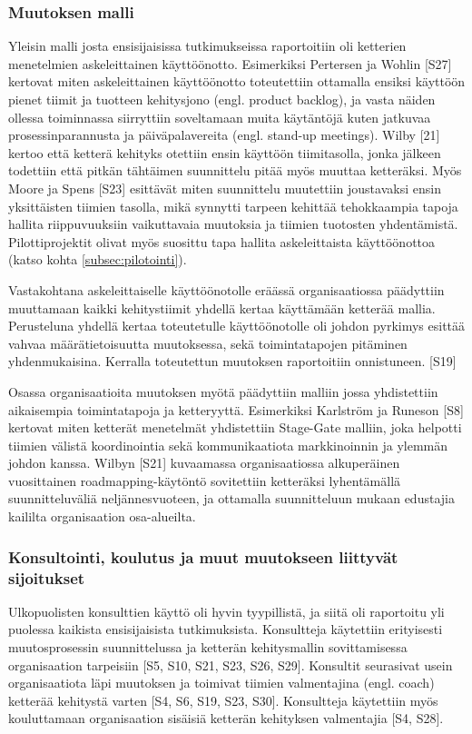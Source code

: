 \subsubsection{Muutoksen malli}

Yleisin malli josta ensisijaisissa tutkimukseissa raportoitiin oli ketterien
menetelmien askeleittainen käyttöönotto. Esimerkiksi Pertersen ja Wohlin [S27]
kertovat miten askeleittainen käyttöönotto toteutettiin ottamalla ensiksi
käyttöön pienet tiimit ja tuotteen kehitysjono (engl. product backlog), ja vasta
näiden ollessa toiminnassa siirryttiin soveltamaan muita käytäntöjä kuten
jatkuvaa prosessinparannusta ja päiväpalavereita (engl. stand-up meetings).
Wilby [21] kertoo että ketterä kehityks otettiin ensin käyttöön tiimitasolla,
jonka jälkeen todettiin että pitkän tähtäimen suunnittelu pitää myös muuttaa
ketteräksi. Myös Moore ja Spens [S23] esittävät miten suunnittelu muutettiin
joustavaksi ensin yksittäisten tiimien tasolla, mikä synnytti tarpeen kehittää
tehokkaampia tapoja hallita riippuvuuksiin vaikuttavaia muutoksia ja tiimien
tuotosten yhdentämistä. Pilottiprojektit olivat myös suosittu tapa hallita
askeleittaista käyttöönottoa (katso kohta \ref{subsec:pilotointi}).

Vastakohtana askeleittaiselle käyttöönotolle eräässä organisaatiossa päädyttiin
muuttamaan kaikki kehitystiimit yhdellä kertaa käyttämään ketterää mallia.
Perusteluna yhdellä kertaa toteutetulle käyttöönotolle oli johdon pyrkimys
esittää vahvaa määrätietoisuutta muutoksessa, sekä toimintatapojen pitäminen
yhdenmukaisina. Kerralla toteutettun muutoksen raportoitiin onnistuneen. [S19]

Osassa organisaatioita muutoksen myötä päädyttiin malliin jossa yhdistettiin
aikaisempia toimintatapoja ja ketteryyttä. Esimerkiksi Karlström ja Runeson [S8]
kertovat miten ketterät menetelmät yhdistettiin Stage-Gate malliin, joka
helpotti tiimien välistä koordinointia sekä kommunikaatiota markkinoinnin ja
ylemmän johdon kanssa. Wilbyn [S21] kuvaamassa organisaatiossa alkuperäinen
vuosittainen roadmapping-käytöntö sovitettiin ketteräksi lyhentämällä
suunnitteluväliä neljännesvuoteen, ja ottamalla suunnitteluun mukaan edustajia
kaililta organisaation osa-alueilta.

\subsubsection{Konsultointi, koulutus ja muut muutokseen liittyvät sijoitukset}

Ulkopuolisten konsulttien käyttö oli hyvin tyypillistä, ja siitä oli raportoitu
yli puolessa kaikista ensisijaisista tutkimuksista. Konsultteja käytettiin
erityisesti muutosprosessin suunnittelussa ja ketterän kehitysmallin
sovittamisessa organisaation tarpeisiin [S5, S10, S21, S23, S26, S29]. Konsultit
seurasivat usein organisaatiota läpi muutoksen ja toimivat tiimien valmentajina
(engl. coach) ketterää kehitystä varten [S4, S6, S19, S23, S30]. Konsultteja
käytettiin myös kouluttamaan organisaation sisäisiä ketterän kehityksen
valmentajia [S4, S28].

